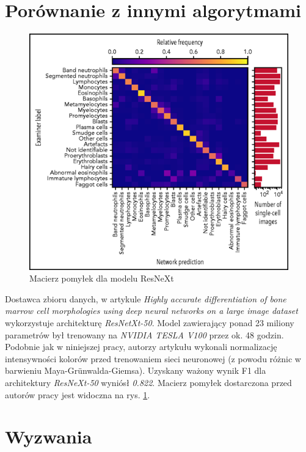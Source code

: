 \section{Porównanie z innymi algorytmami}

\begin{figure}
    \centering
    \includegraphics[width=\textwidth]{resnext_confusion_matrix}
    \caption{Macierz pomyłek dla modelu ResNeXt}
    \label{fig:resnext_confusion_matrix}
\end{figure}

Dostawca zbioru danych, w artykule \textit{Highly accurate differentiation of bone marrow cell morphologies using deep neural networks on a large image dataset} \cite{resnext} wykorzystuje architekturę \textit{ResNetXt-50}.
Model zawierający ponad 23 miliony parametrów był trenowany na \textit{NVIDIA TESLA V100} przez ok. 48 godzin.
Podobnie jak w niniejszej pracy, autorzy artykułu wykonali normalizację intensywności kolorów przed trenowaniem sieci neuronowej (z powodu różnic w barwieniu Maya-Grünwalda-Giemsa).
Uzyskany ważony wynik F1 dla architektury \textit{ResNeXt-50} wyniósł \textit{0.822}. Macierz pomyłek dostarczona przed autorów pracy jest widoczna na rys. \ref{fig:resnext_confusion_matrix}.

\section{Wyzwania}

